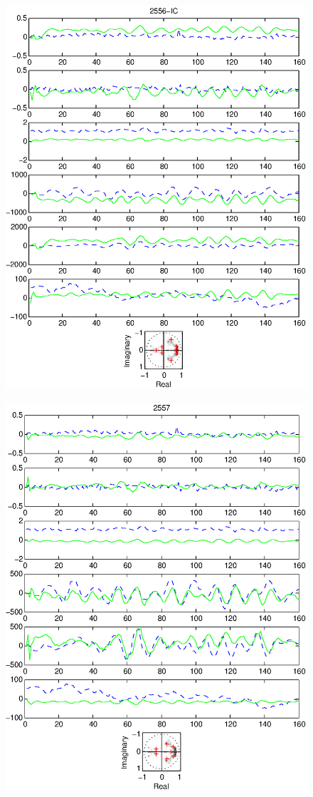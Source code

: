 \documentclass{article}
\begin{document}
\begin{figure}[htb!]\centering
\includegraphics{2556_ic.eps}
\end{figure}\clearpage
\begin{figure}[htb!]\centering
\includegraphics{2557.eps}
\end{figure}\clearpage
\end{document}
